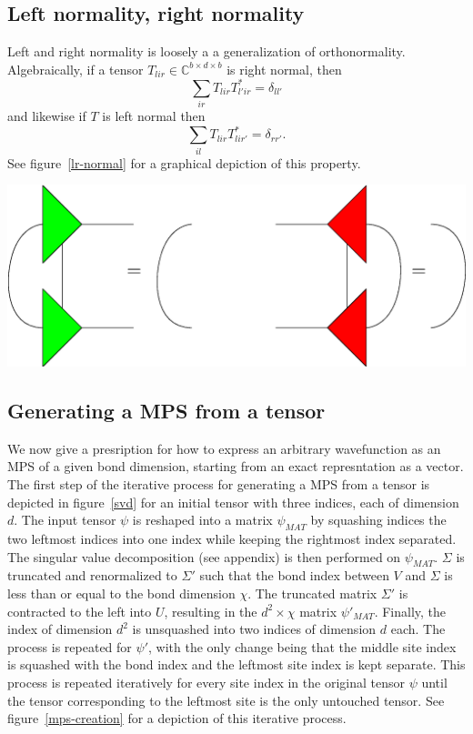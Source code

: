 \documentclass[12pt]{article}
\newenvironment{Figure}
  {\par\medskip\noindent\minipage{\linewidth}}
  {\endminipage\par\medskip}
\begin{document}
\begin{multicols}{2}
	\subsection{Left normality, right normality}
	Left and right normality is loosely a a generalization of
	orthonormality. Algebraically, if a tensor
	$T_{lir}\in\mathds{C}^{b\times d\times b}$
	is right normal, then
	$$\sum_{ir}T_{lir}T^*_{l'ir}=\delta_{ll'}$$
	and likewise if $T$ is left normal then
	$$\sum_{il}T_{lir}T^*_{lir'}=\delta_{rr'}.$$
	See figure~\ref{lr-normal} for a graphical depiction of this property.

	\begin{Figure}
		\center\includegraphics[width=.55\textwidth]{./Figures/lr_normal.eps}
		\label{lr-normal}
	\end{Figure}

	\subsection{Generating a MPS from a tensor}
	We now give a presription for how to express an arbitrary wavefunction as an MPS of a given bond dimension, starting from an exact represntation as a vector.
	The first step of the iterative process for generating a MPS from a
	tensor is depicted in figure~\ref{svd} for an initial tensor with
	three indices, each of dimension $d$. The input tensor $\psi$ is
	reshaped into a matrix $\psi_{MAT}$ by squashing indices the two
	leftmost indices into one index while keeping the rightmost index
	separated. The singular value decomposition (see appendix) is then performed on
	$\psi_{MAT}$. $\Sigma$ is truncated and renormalized to $\Sigma'$
	such that the bond index between $V$ and $\Sigma$ is less than or
	equal to the bond dimension $\chi$. The truncated matrix $\Sigma'$
	is contracted to the left into $U$, resulting in the $d^2\times\chi$
	matrix $\psi'_{MAT}$. Finally, the index of dimension $d^2$ is
	unsquashed into two indices of dimension $d$ each. The process is
	repeated for $\psi'$, with the only change being that the middle
	site index is squashed with the bond index and the leftmost site
	index is kept separate. This process is repeated iteratively for
	every site index in the original tensor $\psi$ until the tensor
	corresponding to the leftmost site is the only untouched tensor.
	See figure~\ref{mps-creation} for a depiction of this iterative
	process.


\end{multicols}
\end{document}
